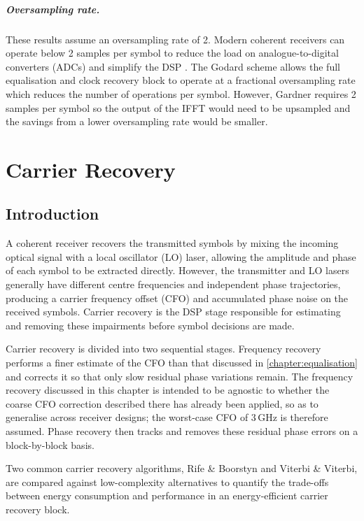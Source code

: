 \documentclass[12pt,a4paper]{report}
\begin{document}
\paragraph{Oversampling rate.} These results assume an oversampling rate of 2. Modern coherent receivers can operate below 2 samples per symbol to reduce the load on analogue-to-digital converters (ADCs) and simplify the DSP \cite{Wang;24}. The Godard scheme allows the full equalisation and clock recovery block to operate at a fractional oversampling rate which reduces the number of operations per symbol. However, Gardner requires 2 samples per symbol so the output of the IFFT would need to be upsampled and the savings from a lower oversampling rate would be smaller.
\chapter{Carrier Recovery}\label{chapter:carrier_recovery}

\section{Introduction}

A coherent receiver recovers the transmitted symbols by mixing the incoming optical signal with a local oscillator (LO) laser, allowing the amplitude and phase of each symbol to be extracted directly. However, the transmitter and LO lasers generally have different centre frequencies and independent phase trajectories, producing a carrier frequency offset (CFO) and accumulated phase noise on the received symbols. Carrier recovery is the DSP stage responsible for estimating and removing these impairments before symbol decisions are made.

Carrier recovery is divided into two sequential stages. Frequency recovery performs a finer estimate of the CFO than that discussed in \cref{chapter:equalisation} and corrects it so that only slow residual phase variations remain. The frequency recovery discussed in this chapter is intended to be agnostic to whether the coarse CFO correction described there has already been applied, so as to generalise across receiver designs; the worst-case CFO of 3\,GHz is therefore assumed. Phase recovery then tracks and removes these residual phase errors on a block-by-block basis.

Two common carrier recovery algorithms, Rife \& Boorstyn and Viterbi \& Viterbi, are compared against low-complexity alternatives to quantify the trade-offs between energy consumption and performance in an energy-efficient carrier recovery block.
\end{document}
